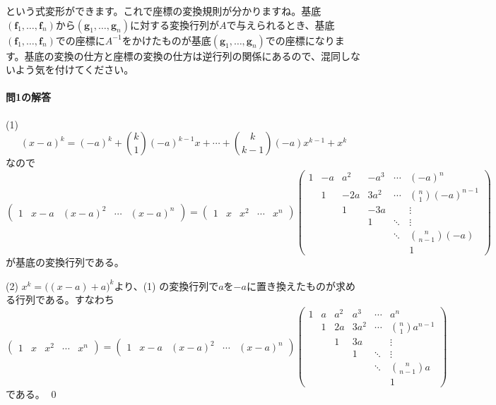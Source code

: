 という式変形ができます。これで座標の変換規則が分かりますね。基底$(\bm{f}_1, \ldots, \bm{f}_n)$から$(\bm{g}_1, \ldots, \bm{g}_n)$に対する変換行列が$A$で与えられるとき、基底$(\bm{f}_1, \ldots, \bm{f}_n)$での座標に$A^{-1}$をかけたものが基底$(\bm{g}_1, \ldots, \bm{g}_n)$での座標になります。基底の変換の仕方と座標の変換の仕方は逆行列の関係にあるので、混同しないよう気を付けてください。

\paragraph{問1の解答}
\noindent (1)
\[
(x - a) ^k = (-a)^k + \binom{k}{1} (-a)^{k - 1} x + \cdots + \binom{k}{k - 1} (-a) x^{k - 1} + x^k
\]
なので
\[
\begin{pmatrix}
1 & x - a & (x - a)^2 & \cdots & (x - a)^n
\end{pmatrix}
=
\begin{pmatrix}
1 & x & x^2 & \cdots & x^n
\end{pmatrix}
\begin{pmatrix}
1 & -a & a^2 & -a^3 & \cdots & (-a)^n \\
 & 1 & -2a & 3a^2 & \cdots & \binom{n}{1}(-a)^{n - 1} \\
 & & 1 & -3a & & \vdots \\
 & & & 1 & \ddots & \vdots \\
 & & & & \ddots & \binom{n}{n - 1}(-a) \\
 & & & & & 1
\end{pmatrix}
\]
が基底の変換行列である。

\noindent (2) $x^k = \bigl((x - a) + a\bigr)^k$より、(1) の変換行列で$a$を$-a$に置き換えたものが求める行列である。すなわち
\[
\begin{pmatrix}
1 & x & x^2 & \cdots & x^n
\end{pmatrix}
=
\begin{pmatrix}
1 & x - a & (x - a)^2 & \cdots & (x - a)^n
\end{pmatrix}
\begin{pmatrix}
1 & a & a^2 & a^3 & \cdots & a^n \\
 & 1 & 2a & 3a^2 & \cdots & \binom{n}{1}a^{n - 1} \\
 & & 1 & 3a & & \vdots \\
 & & & 1 & \ddots & \vdots \\
 & & & & \ddots & \binom{n}{n - 1}a \\
 & & & & & 1
\end{pmatrix}
\]
である。 \qed

